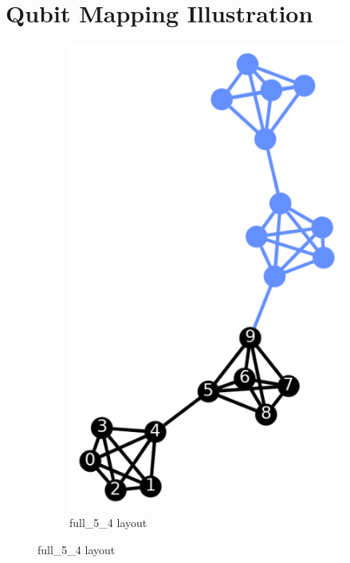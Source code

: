 \chapter{Qubit Mapping Illustration} \label{app:virtual-on-physical-illustration}
\begin{figure}[!htb]
    \centering
    \begin{subfigure}{0.3\linewidth}
        \includegraphics[width=\linewidth]{image/dj_10_full_5_4.png}
        \caption{full\_5\_4 layout}
        \label{fig:dj_10_full_5_4}
    \end{subfigure}

\end{figure}
